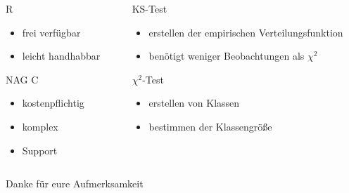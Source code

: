 \documentclass{beamer}
\begin{document}
\begin{frame}{\insertsection}

\begin{columns}
\begin{column}{.48\textwidth}
\begin{block}{R}
	\begin{itemize}
		\item frei verfügbar
		\item leicht handhabbar
	\end{itemize}
\end{block}
\vspace{1cm}

\begin{block}{NAG C}
	\begin{itemize}
		\item kostenpflichtig
		\item komplex
		\item Support
	\end{itemize}
\end{block}
\end{column}

\hfill
\begin{column}{.48\textwidth}
\begin{block}{KS-Test}
	\begin{itemize}
		\item erstellen der empirischen Verteilungsfunktion
		\item benötigt weniger Beobachtungen als $\chi^2$
	\end{itemize}
\end{block}
\begin{block}{$\chi^2$-Test}
	\begin{itemize}		
		\item erstellen von Klassen
		\item bestimmen der Klassengröße
	\end{itemize}
\end{block}
\end{column}
\end{columns}
\pause
{\center \Large Danke für eure Aufmerksamkeit}
\end{frame}
\end{document}
